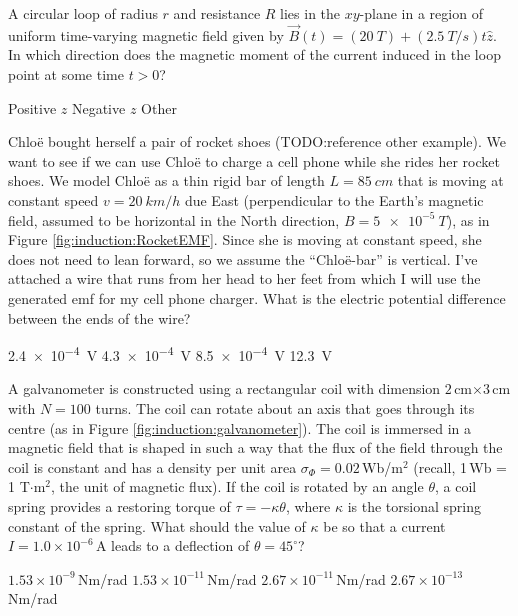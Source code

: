 \question A circular loop of radius $r$ and resistance $R$ lies in the $xy$-plane in a region of uniform time-varying magnetic field given by $\vec B(t)=(\SI{20}{T})+(\SI{2.5}{T/s})t\hat z$. In which direction does the magnetic moment of the current induced in the loop point at some time $t>0$?
\begin{checkboxes}
\choice Positive $z$ 
\CorrectChoice Negative $z$ \correct
\choice Other
\end{checkboxes}

\question Chlo\"e bought herself a pair of rocket shoes (TODO:reference other example). We want to see if we can use Chlo\"e to charge a cell phone while she rides her rocket shoes. We model Chlo\"e as a thin rigid bar of length $L=\SI{85}{cm}$ that is moving at constant speed $v=\SI{20}{km/h}$ due East (perpendicular to the Earth's magnetic field, assumed to be horizontal in the North direction, $B=\SI{5e-5}{T}$), as in Figure \ref{fig:induction:RocketEMF}. Since she is moving at constant speed, she does not need to lean forward, so we assume the ``Chlo\"e-bar'' is vertical. I've attached a wire that runs from her head to her feet from which I will use the generated emf for my cell phone charger. What is the electric potential difference between the ends of the wire?
\begin{choices} 
\CorrectChoice \SI{2.4e-4}{V} \correct
\choice \SI{4.3e-4}{V}
\choice \SI{8.5e-4}{V}
\choice \SI{12.3}{V}
\end{choices}

\question \label{q:induction:galvanometer} A galvanometer is constructed using a rectangular coil with dimension $2$\,cm$\times3$\,cm with $N=100$ turns. The coil can rotate about an axis that goes through its centre (as in Figure \ref{fig:induction:galvanometer}). The coil is immersed in a magnetic field that is shaped in such a way that the flux of the field through the coil is constant and has a density per unit area $\sigma_\Phi=0.02$\,Wb/m$^2$ (recall, 1\,Wb = 1 T$\cdot$m$^2$, the unit of magnetic flux).  If the coil is rotated by an angle $\theta$, a coil spring provides a restoring torque of $\tau=-\kappa\theta$, where $\kappa$ is the torsional spring constant of the spring. What should the value of $\kappa$ be so that a current $I=1.0\times 10^{-6}$\,A leads to a deflection of $\theta = 45^{\circ}$?
\begin{checkboxes}
\CorrectChoice $1.53\times 10^{-9}$\,Nm/rad \correct
\choice $1.53\times 10^{-11}$\,Nm/rad
\choice $2.67\times 10^{-11}$\,Nm/rad
\choice $2.67\times 10^{-13}$\,Nm/rad
\end{checkboxes}

